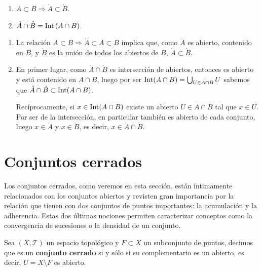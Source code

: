 \begin{coro}
\begin{enumerate}
    \item $A \subset B \Rightarrow \mathring{A} \subset \mathring{B}$.
    \item $\mathring{A} \cap \mathring{B} = \operatorname{Int} \left( A \cap B \right)$.
\end{enumerate}
\end{coro}
\begin{demo}
\begin{enumerate}
    \item La relación $A \subset B \Rightarrow \mathring{A} \subset A \subset B$ implica que, como $\mathring{A}$ es abierto, contenido en $B$, y $\mathring{B}$ es la unión de todos los abiertos de $B$, $\mathring{A} \subset \mathring{B}$.
    \item En primer lugar, como $\mathring{A}\cap \mathring{B}$ es intersección de abiertos, entonces es abierto y está contenido en $A\cap B$, luego por ser $\operatorname{Int}(A\cap B) = \bigcup_{U\in A\cap B}U$ sabemos que $\mathring{A}\cap \mathring{B} \subset \operatorname{Int}(A\cap B)$.
    
	Recíprocamente, si $x\in \operatorname{Int}(A\cap B)$ existe un abierto $U \in A\cap B$ tal que $x\in U$. Por ser de la intersección, en particular también es abierto de cada conjunto, luego $x\in \mathring{A}$ y $x\in \mathring{B}$, es decir, $x\in \mathring{A}\cap \mathring{B}$.
\end{enumerate}
\end{demo}

\section{Conjuntos cerrados}%
\label{sec:conjuntos_cerrados}
Los conjuntos cerrados, como veremos en esta sección, están íntimamente relacionados con los conjuntos abiertos y revisten gran importancia por la relación que tienen con dos conjuntos de puntos importantes: la acumulación y la adherencia. Estas dos últimas nociones permiten caracterizar conceptos como la convergencia de sucesiones o la densidad de un conjunto.

\begin{defi}
Sea $\left( X, \mathcal{T} \right)$ un espacio topológico y $F\subset X$ un subconjunto de puntos, decimos que es un \textbf{conjunto cerrado} si y sólo si su complementario es un abierto, es decir, $U = X \setminus F$ es abierto.
\end{defi}

